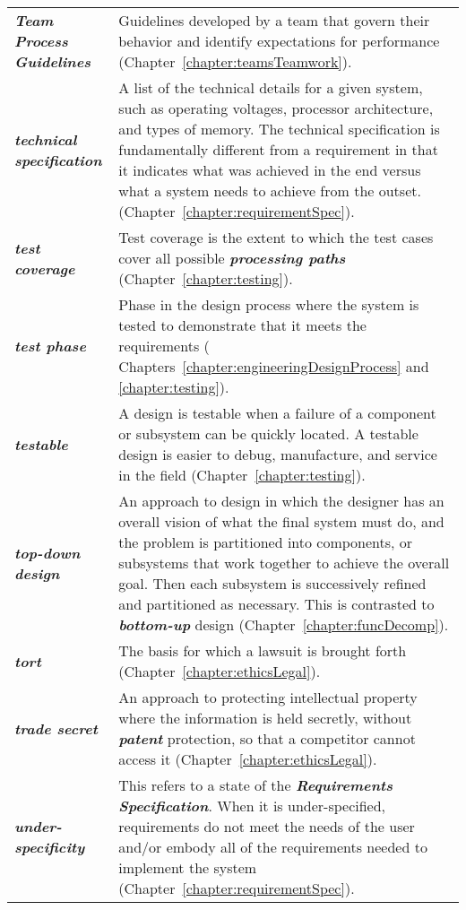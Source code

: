 \begin{longtable} { p{3cm} p{11cm}}
\emph{\textbf{Team Process Guidelines}} & Guidelines developed by a team
that govern their behavior and identify expectations for performance
(Chapter~\ref{chapter:teamsTeamwork}). \B \\
\emph{\textbf{technical specification}} & A list of the technical
details for a given system, such as operating voltages, processor
architecture, and types of memory. The technical specification is
fundamentally different from a requirement in that it indicates what was
achieved in the end versus what a system needs to achieve from the
outset. (Chapter~\ref{chapter:requirementSpec}). \B \\
\emph{\textbf{test coverage}} & Test coverage is the extent to which the
test cases cover all possible \emph{\textbf{processing paths}} 
(Chapter~\ref{chapter:testing}). \B \\
\emph{\textbf{test phase}} & Phase in the design process where the
system is tested to demonstrate that it meets the requirements (
Chapters~\ref{chapter:engineeringDesignProcess} and \ref{chapter:testing}). \B \\
\emph{\textbf{testable}} & A design is testable when a failure of a
component or subsystem can be quickly located. A testable design is
easier to debug, manufacture, and service in the field (Chapter~\ref{chapter:testing}). \B \\
\emph{\textbf{top-down design}} & An approach to design in which the
designer has an overall vision of what the final system must do, and the
problem is parti­tioned into components, or subsystems that work together
to achieve the overall goal. Then each subsystem is successively refined
and partitioned as necessary. This is contrasted to
\emph{\textbf{bottom-up}} design (Chapter~\ref{chapter:funcDecomp}). \B \\
\emph{\textbf{tort}} & The basis for which a lawsuit is brought forth
(Chapter~\ref{chapter:ethicsLegal}). \B \\
\emph{\textbf{trade secret}} & An approach to protecting intellectual
property where the information is held secretly, without
\emph{\textbf{patent}} protection, so that a competitor cannot access it
(Chapter~\ref{chapter:ethicsLegal}). \B \\
\emph{\textbf{under-specificity}} & This refers to a state of the
\emph{\textbf{Requirements Specification}}. When it is under-specified,
requirements do not meet the needs of the user and/or embody all of the
requirements needed to implement the system (Chapter~\ref{chapter:requirementSpec}). \B \\

\end{longtable}
